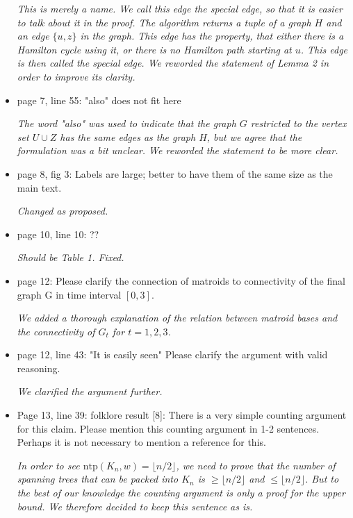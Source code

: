 \documentclass[11pt,a4paper]{article}
\begin{document}
\begin{itemize}
\textit{This is merely a name. We call this edge the \emph{special edge}, so that it is easier to talk about it in the proof. The algorithm returns a tuple of a graph $H$ and an edge $\{u,z\}$ in the graph. This edge has the property, that either there is a Hamilton cycle using it, or there is no Hamilton path starting at $u$. This edge is then called the special edge. We reworded the statement of Lemma 2 in order to improve its clarity.}

\item page 7, line 55: "also" does not fit here

\textit{The word "also" was used to indicate that the graph $G$ restricted to the vertex set $U \cup Z$ has the same edges as the graph $H$, but we agree that the formulation was a bit unclear. We reworded the statement to be more clear.}

\item page 8, fig 3: Labels are large; better to have them of the same size as the main text.

\textit{Changed as proposed.}

\item page 10, line 10: ??

\textit{Should be Table 1. Fixed.}

\item page 12: Please clarify the connection of matroids to connectivity of the final graph G in time interval $[0,3]$.

\textit{We added a thorough explanation of the relation between matroid bases and the connectivity of $G_t$ for $t=1,2,3$.}

\item page 12, line 43: "It is easily seen" Please clarify the argument with valid reasoning.

\textit{We clarified the argument further.}

\item Page 13, line 39: folklore result [8]: There is a very simple counting argument for this claim. Please mention this counting argument in 1-2 sentences. Perhaps it is not necessary to mention a reference for this.

\textit{In order to see $\text{ntp}(K_n, w) = \lfloor n/2 \rfloor$, we need to prove that the number of spanning trees that can be packed into $K_n$ is $\geq \lfloor n/2 \rfloor$ and $\leq \lfloor n/2 \rfloor$. But to the best of our knowledge the counting argument is only a proof for the upper bound. We therefore decided to keep this sentence as is.}


\end{itemize}
\end{document}
